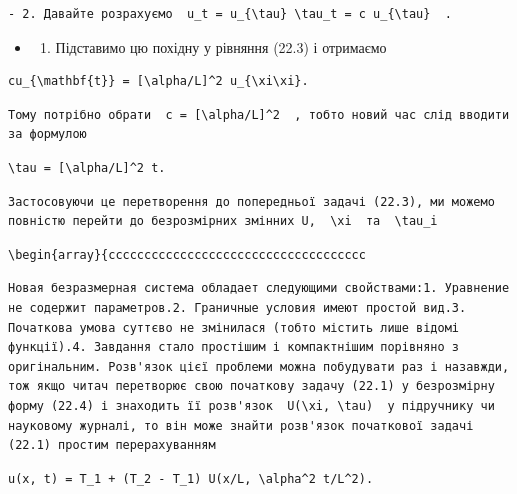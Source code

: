 \documentclass[
  ukrainian,
]{article}
\providecommand{\tightlist}{%
  \setlength{\itemsep}{0pt}\setlength{\parskip}{0pt}}
\begin{document}
\begin{verbatim}
- 2. Давайте розрахуємо  u_t = u_{\tau} \tau_t = c u_{\tau}  .
\end{verbatim}

\begin{itemize}
\tightlist
\item
  \begin{enumerate}
  \def\labelenumi{\arabic{enumi}.}
  \setcounter{enumi}{2}
  \tightlist
  \item
    Підставимо цю похідну у рівняння (22.3) і отримаємо
  \end{enumerate}
\end{itemize}

\begin{verbatim}
cu_{\mathbf{t}} = [\alpha/L]^2 u_{\xi\xi}.
\end{verbatim}

\begin{verbatim}
Тому потрібно обрати  c = [\alpha/L]^2  , тобто новий час слід вводити за формулою
\end{verbatim}

\begin{verbatim}
\tau = [\alpha/L]^2 t.
\end{verbatim}

\begin{verbatim}
Застосовуючи це перетворення до попередньої задачі (22.3), ми можемо повністю перейти до безрозмірних змінних U,  \xi  та  \tau_i
\end{verbatim}

\begin{verbatim}
\begin{array}{cccccccccccccccccccccccccccccccccccc
\end{verbatim}

\begin{verbatim}
Новая безразмерная система обладает следующими свойствами:1. Уравнение не содержит параметров.2. Граничные условия имеют простой вид.3. Початкова умова суттєво не змінилася (тобто містить лише відомі функції).4. Завдання стало простішим і компактнішим порівняно з оригінальним. Розв'язок цієї проблеми можна побудувати раз і назавжди, тож якщо читач перетворює свою початкову задачу (22.1) у безрозмірну форму (22.4) і знаходить її розв'язок  U(\xi, \tau)  у підручнику чи науковому журналі, то він може знайти розв'язок початкової задачі (22.1) простим перерахуванням
\end{verbatim}

\begin{verbatim}
u(x, t) = T_1 + (T_2 - T_1) U(x/L, \alpha^2 t/L^2).
\end{verbatim}
\end{document}
